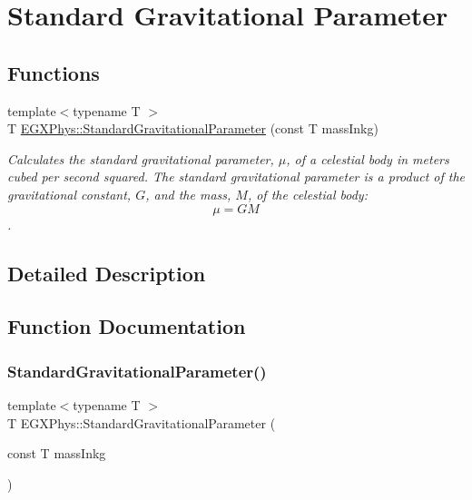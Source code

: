 \hypertarget{group___e_g_x_phys-_astrophysics-_standard_gravitational_parameter}{}\section{Standard Gravitational Parameter}
\label{group___e_g_x_phys-_astrophysics-_standard_gravitational_parameter}
\subsection*{Functions}
\begin{DoxyCompactItemize}
\item 
{\footnotesize template$<$typename T $>$ }\\T \mbox{\hyperlink{group___e_g_x_phys-_astrophysics-_standard_gravitational_parameter_ga37f4ed78b0fc23603b49ade3e435ea20}{E\+G\+X\+Phys\+::\+Standard\+Gravitational\+Parameter}} (const T mass\+Inkg)
\begin{DoxyCompactList}\small\item\em Calculates the standard gravitational parameter, $\mu$, of a celestial body in meters cubed per second squared. The standard gravitational parameter is a product of the gravitational constant, $G$, and the mass, $M$, of the celestial body\+: \[\mu = GM\]. \end{DoxyCompactList}\end{DoxyCompactItemize}


\subsection{Detailed Description}


\subsection{Function Documentation}
\mbox{\label{group___e_g_x_phys-_astrophysics-_standard_gravitational_parameter_ga37f4ed78b0fc23603b49ade3e435ea20}} 
\subsubsection{\texorpdfstring{Standard\+Gravitational\+Parameter()}{StandardGravitationalParameter()}}
{\footnotesize\ttfamily template$<$typename T $>$ \\
T E\+G\+X\+Phys\+::\+Standard\+Gravitational\+Parameter (\begin{DoxyParamCaption}\item[{const T}]{mass\+Inkg }\end{DoxyParamCaption})}



